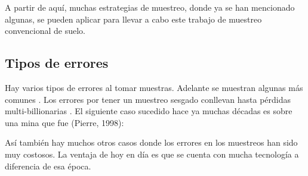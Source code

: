 \documentclass{report}
\begin{document}
A partir de aquí, muchas estrategias de muestreo, donde ya se han mencionado algunas, se pueden aplicar para llevar a cabo este trabajo de muestreo convencional de suelo.

\subsection{Tipos de errores}

Hay varios tipos de errores al tomar muestras. Adelante se muestran algunas más comunes \cite{innec-2007}. Los errores por tener un muestreo sesgado conllevan hasta pérdidas multi-billionarias \cite{gy-1998}. El siguiente caso sucedido hace ya muchas décadas es sobre una mina que fue (Pierre, 1998):

\bigbreak


\bigbreak

Así también hay muchos otros casos donde los errores en los muestreos han sido muy costosos. La ventaja de hoy en día es que se cuenta con mucha tecnología a diferencia de esa época.

\bigbreak
\end{document}
